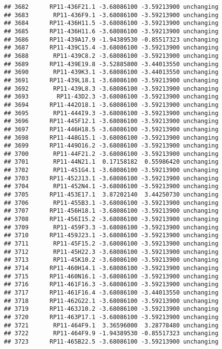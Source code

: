 \documentclass[]{article}
\begin{document}
\begin{verbatim}
## 3682      RP11-436F21.1 -3.68086100 -3.59213900 unchanging
## 3683       RP11-436F9.1 -3.68086100 -3.59213900 unchanging
## 3684      RP11-436H11.5 -3.68086100 -3.59213900 unchanging
## 3685      RP11-436H11.6 -3.68086100 -3.59213900 unchanging
## 3686      RP11-439A17.9 -1.94389530 -0.85517323 unchanging
## 3687      RP11-439C15.4 -3.68086100 -3.59213900 unchanging
## 3688       RP11-439C8.2 -3.68086100 -3.59213900 unchanging
## 3689      RP11-439E19.8 -3.52885800 -3.44013550 unchanging
## 3690       RP11-439K3.1 -3.68086100 -3.44013550 unchanging
## 3691      RP11-439L18.1 -3.68086100 -3.59213900 unchanging
## 3692       RP11-439L8.3 -3.68086100 -3.59213900 unchanging
## 3693        RP11-43D2.3 -3.68086100 -3.59213900 unchanging
## 3694      RP11-442O18.1 -3.68086100 -3.59213900 unchanging
## 3695       RP11-444I9.3 -3.68086100 -3.59213900 unchanging
## 3696      RP11-445F12.1 -3.68086100 -3.59213900 unchanging
## 3697      RP11-446H18.5 -3.68086100 -3.59213900 unchanging
## 3698      RP11-448G15.1 -3.68086100 -3.59213900 unchanging
## 3699      RP11-449O16.2 -3.68086100 -3.59213900 unchanging
## 3700       RP11-44F21.2 -3.68086100 -3.59213900 unchanging
## 3701       RP11-44N21.1  0.17158182  0.55986420 unchanging
## 3702       RP11-451G4.1 -3.68086100 -3.59213900 unchanging
## 3703      RP11-452J13.1 -3.68086100 -3.59213900 unchanging
## 3704       RP11-452N4.1 -3.68086100 -3.59213900 unchanging
## 3705      RP11-453E17.1  3.87202140  3.44250730 unchanging
## 3706       RP11-455B3.1 -3.68086100 -3.59213900 unchanging
## 3707      RP11-456H18.1 -3.68086100 -3.59213900 unchanging
## 3708      RP11-456I15.2 -3.68086100 -3.59213900 unchanging
## 3709       RP11-459F3.3 -3.68086100 -3.59213900 unchanging
## 3710      RP11-459J23.1 -3.68086100 -3.59213900 unchanging
## 3711       RP11-45F15.2 -3.68086100 -3.59213900 unchanging
## 3712       RP11-45H22.3 -3.68086100 -3.59213900 unchanging
## 3713       RP11-45K10.2 -3.68086100 -3.59213900 unchanging
## 3714      RP11-460H14.1 -3.68086100 -3.59213900 unchanging
## 3715      RP11-460N16.1 -3.68086100 -3.59213900 unchanging
## 3716      RP11-461F16.3 -3.68086100 -3.59213900 unchanging
## 3717      RP11-461F16.4 -3.68086100 -3.44013550 unchanging
## 3718      RP11-462G22.1 -3.68086100 -3.59213900 unchanging
## 3719      RP11-463J10.2 -3.68086100 -3.59213900 unchanging
## 3720      RP11-463P17.1 -3.68086100 -3.59213900 unchanging
## 3721       RP11-464F9.1  3.36596000  3.28778480 unchanging
## 3722       RP11-464F9.9 -1.94389530 -0.85517323 unchanging
## 3723      RP11-465B22.5 -3.68086100 -3.59213900 unchanging

\end{verbatim}
\end{document}

